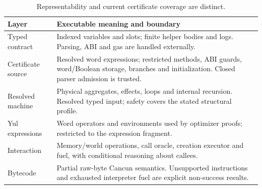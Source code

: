 \documentclass[conference]{IEEEtran}
\begin{document}
\begin{table}[t]
\caption{Representability and current certificate coverage are distinct.}
\label{tab:layers}
\small
\begin{tabularx}{\columnwidth}{@{}p{}X@{}}
\toprule
Layer & Executable meaning and boundary \\
\midrule
Typed contract & Indexed variables and slots; finite helper bodies and logs.
Parsing, ABI and gas are handled externally. \\
Certificate source & Resolved word expressions; restricted methods, ABI guards,
word/Boolean storage, branches and initialization. Closed parser admission is trusted. \\
Resolved machine & Physical aggregates, effects, loops and internal recursion.
Resolved typed input; safety covers the stated structural profile. \\
Yul expressions & Word operators and environments used by optimizer proofs;
restricted to the expression fragment. \\
Interaction & Memory/world operations, call oracle, creation executor and
fuel, with conditional reasoning about callees. \\
Bytecode & Partial raw-byte Cancun semantics. Unsupported instructions and
exhausted interpreter fuel are explicit non-success results. \\
\bottomrule
\end{tabularx}
\end{table}
\end{document}
